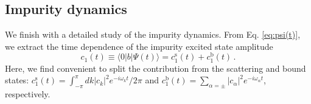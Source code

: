 \documentclass[aps,pra,twocolumn,floatfix,superscriptaddress]{revtex4-1}%
\begin{document}


\subsection{Impurity dynamics}

{\color{blue}We finish with a detailed study of the impurity dynamics. From Eq. \eqref{eq:psi(t)}, we extract the time dependence of the impurity excited state amplitude}
\begin{equation}
\label{eq:qubit_amplitude}
c_1(t) \equiv
\langle 0|b|\Psi(t)\rangle 
 =
c_1^\text{s}(t) + 
c_1^\text{b}(t) \, .
\end{equation}
{\color{blue}Here, we find convenient to split the contribution from the scattering and bound states: $c_1^\text{s}(t) = \int_{-\pi}^\pi dk |c_k|^2 e^{-i\omega_k t}/2\pi$ and $c_1^\text{b}(t) = \sum_{\alpha=\pm}|c_\alpha|^2 e^{-i\omega_\alpha t}$, respectively.}

\end{document}
